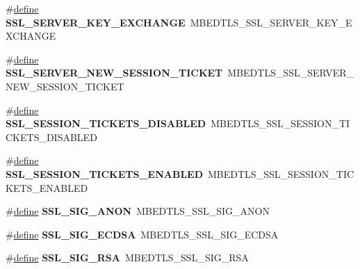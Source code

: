 \begin{DoxyCompactItemize}
\item 
\mbox{\label{compat-1_83_8h_a0e7a398034bb1b60fd957ce9ec6e940f}} 
\#\hyperlink{structdefine}{define} {\bfseries S\+S\+L\+\_\+\+S\+E\+R\+V\+E\+R\+\_\+\+K\+E\+Y\+\_\+\+E\+X\+C\+H\+A\+N\+GE}~M\+B\+E\+D\+T\+L\+S\+\_\+\+S\+S\+L\+\_\+\+S\+E\+R\+V\+E\+R\+\_\+\+K\+E\+Y\+\_\+\+E\+X\+C\+H\+A\+N\+GE
\item 
\mbox{\label{compat-1_83_8h_a57536ae96ad54b96fa43bbb04c836e82}} 
\#\hyperlink{structdefine}{define} {\bfseries S\+S\+L\+\_\+\+S\+E\+R\+V\+E\+R\+\_\+\+N\+E\+W\+\_\+\+S\+E\+S\+S\+I\+O\+N\+\_\+\+T\+I\+C\+K\+ET}~M\+B\+E\+D\+T\+L\+S\+\_\+\+S\+S\+L\+\_\+\+S\+E\+R\+V\+E\+R\+\_\+\+N\+E\+W\+\_\+\+S\+E\+S\+S\+I\+O\+N\+\_\+\+T\+I\+C\+K\+ET
\item 
\mbox{\label{compat-1_83_8h_a5f213a5841510e97a4c7ee9d58403a75}} 
\#\hyperlink{structdefine}{define} {\bfseries S\+S\+L\+\_\+\+S\+E\+S\+S\+I\+O\+N\+\_\+\+T\+I\+C\+K\+E\+T\+S\+\_\+\+D\+I\+S\+A\+B\+L\+ED}~M\+B\+E\+D\+T\+L\+S\+\_\+\+S\+S\+L\+\_\+\+S\+E\+S\+S\+I\+O\+N\+\_\+\+T\+I\+C\+K\+E\+T\+S\+\_\+\+D\+I\+S\+A\+B\+L\+ED
\item 
\mbox{\label{compat-1_83_8h_a67615999624515739ca30912bf5b76fe}} 
\#\hyperlink{structdefine}{define} {\bfseries S\+S\+L\+\_\+\+S\+E\+S\+S\+I\+O\+N\+\_\+\+T\+I\+C\+K\+E\+T\+S\+\_\+\+E\+N\+A\+B\+L\+ED}~M\+B\+E\+D\+T\+L\+S\+\_\+\+S\+S\+L\+\_\+\+S\+E\+S\+S\+I\+O\+N\+\_\+\+T\+I\+C\+K\+E\+T\+S\+\_\+\+E\+N\+A\+B\+L\+ED
\item 
\mbox{\label{compat-1_83_8h_a733760de6baaa13ccac093ee771d7079}} 
\#\hyperlink{structdefine}{define} {\bfseries S\+S\+L\+\_\+\+S\+I\+G\+\_\+\+A\+N\+ON}~M\+B\+E\+D\+T\+L\+S\+\_\+\+S\+S\+L\+\_\+\+S\+I\+G\+\_\+\+A\+N\+ON
\item 
\mbox{\label{compat-1_83_8h_a04b4f34dc02fbd2da44ab8b9dff6b10f}} 
\#\hyperlink{structdefine}{define} {\bfseries S\+S\+L\+\_\+\+S\+I\+G\+\_\+\+E\+C\+D\+SA}~M\+B\+E\+D\+T\+L\+S\+\_\+\+S\+S\+L\+\_\+\+S\+I\+G\+\_\+\+E\+C\+D\+SA
\item 
\mbox{\label{compat-1_83_8h_ac4b8439b3f7e4a686b3482b1b64ac646}} 
\#\hyperlink{structdefine}{define} {\bfseries S\+S\+L\+\_\+\+S\+I\+G\+\_\+\+R\+SA}~M\+B\+E\+D\+T\+L\+S\+\_\+\+S\+S\+L\+\_\+\+S\+I\+G\+\_\+\+R\+SA

\end{DoxyCompactItemize}

